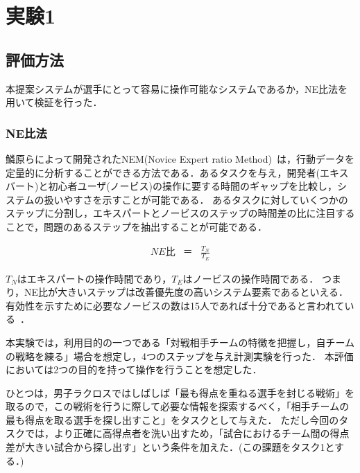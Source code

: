\documentclass[sotsuron]{kuee}
\begin{document}
	\section{実験1}
		\subsection{評価方法}
			本提案システムが選手にとって容易に操作可能なシステムであるか，NE比法を用いて検証を行った．
				\subsubsection{NE比法}
					鱗原らによって開発されたNEM(Novice Expert ratio Method)~\cite{NEM}は，行動データを定量的に分析することができる方法である．あるタスクを与え，開発者(エキスバート)と初心者ユーザ(ノービス)の操作に要する時間のギャップを比較し，システムの扱いやすさを示すことが可能である．
					あるタスクに対していくつかのステップに分割し，エキスパートとノービスのステップの時間差の比に注目することで，問題のあるステップを抽出することが可能である．

					\begin{eqnarray}
						NE比 & ＝ & \frac{T_N}{T_E}
					\end{eqnarray}
					
					$T_N$はエキスパートの操作時間であり，$T_E$はノービスの操作時間である．
					つまり，NE比が大きいステップは改善優先度の高いシステム要素であるといえる．
					有効性を示すために必要なノービスの数は15人であれば十分であると言われている~\cite{Nielsen}．
					
					本実験では，利用目的の一つである「対戦相手チームの特徴を把握し，自チームの戦略を練る」場合を想定し，4つのステップを与え計測実験を行った．
					本評価においては2つの目的を持って操作を行うことを想定した．
					
					ひとつは，男子ラクロスではしばしば「最も得点を重ねる選手を封じる戦術」を取るので，この戦術を行うに際して必要な情報を探索するべく，「相手チームの最も得点を取る選手を探し出すこと」をタスクとして与えた．
					ただし今回のタスクでは，より正確に高得点者を洗い出すため，「試合におけるチーム間の得点差が大きい試合から探し出す」という条件を加えた．(この課題をタスク1とする．)
					
\end{document}
